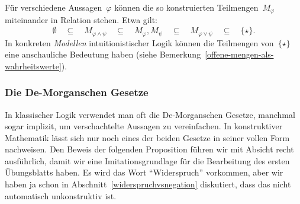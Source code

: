 \documentclass[a4paper,ngerman,12pt]{scrartcl}
\theoremstyle{definition}
\theoremstyle{plain}
\theoremstyle{remark}
\renewcommand{\_}{\mathpunct{.}\,}
\newcommand{\?}{\,{:}\,}
\begin{document}
Für verschiedene Aussagen~$\varphi$ können die so konstruierten
Teilmengen~$M_\varphi$ miteinander in Relation stehen. Etwa gilt:
\[ \emptyset \quad\subseteq\quad M_{\varphi \wedge \psi}
  \quad\subseteq\quad M_\varphi, M_\psi \quad\subseteq\quad
  M_{\varphi \vee \psi} \quad\subseteq\quad
  \{\star\}. \]
In konkreten \emph{Modellen} intuitionistischer Logik können die Teilmengen
von~$\{\star\}$ eine anschauliche Bedeutung haben (siehe
Bemerkung~\ref{offene-mengen-als-wahrheitswerte}).


\subsubsection*{Die De-Morganschen Gesetze}

In klassischer Logik verwendet man oft die De-Morganschen Gesetze, manchmal
sogar implizit, um verschachtelte Aussagen zu vereinfachen. In konstruktiver
Mathematik lässt sich nur noch eines der beiden Gesetze in seiner vollen Form
nachweisen. Den Beweis der folgenden Proposition führen wir mit Absicht recht
ausführlich, damit wir eine Imitationsgrundlage für die Bearbeitung des ersten
Übungsblatts haben. Es wird das Wort "`Widerspruch"' vorkommen, aber wir haben ja
schon in Abschnitt~\ref{widerspruchvsnegation} diskutiert, dass das nicht
automatisch unkonstruktiv ist.
\end{document}
